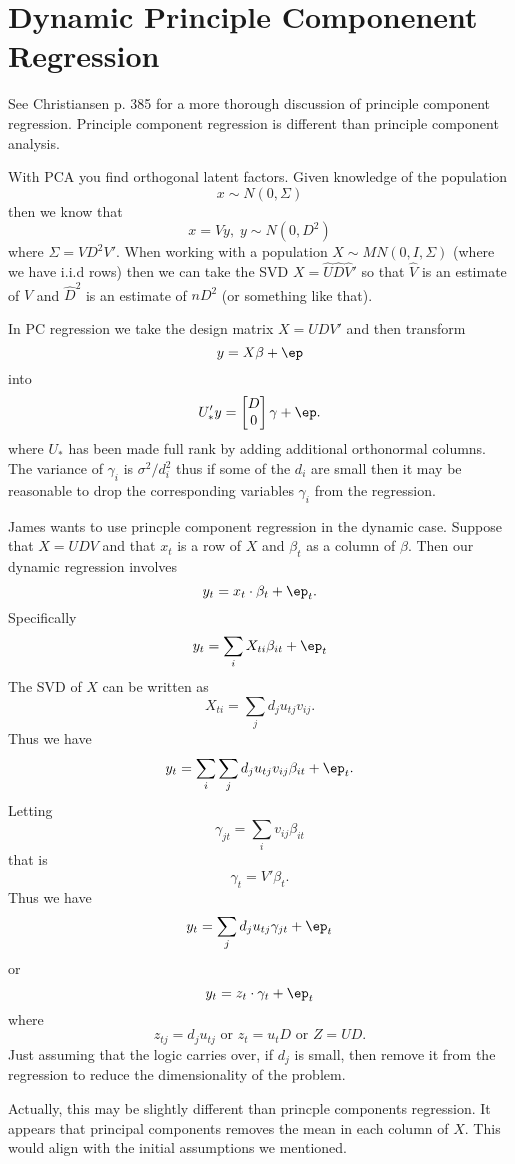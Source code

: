 \documentclass{article}
\begin{document}
\section{Dynamic Principle Componenent Regression}

See Christiansen p. 385 for a more thorough discussion of principle component
regression.  Principle component regression is different than principle
component analysis.

With PCA you find orthogonal latent factors.  Given knowledge of the population
\[
x \sim N(0, \Sigma)
\]
then we know that
\[
x = Vy, \; y \sim N(0, D^2)
\]
where $\Sigma = VD^2V'$.  When working with a population $X \sim MN(0, I,
\Sigma)$ (where we have i.i.d rows) then we can take the SVD $X = \hat U \hat D
\hat V'$ so that $\hat V$ is an estimate of $V$ and $\hat D^2$ is an estimate of
$n D^2$ (or something like that).

In PC regression we take the design matrix $X = U D V'$ and then transform
\[
y = X \beta + \ep
\]
into
\[
U_*' y = 
\begin{bmatrix}
D \\ 0
\end{bmatrix}
\gamma + \ep.
\]
where $U_*$ has been made full rank by adding additional orthonormal columns.
The variance of $\gamma_i$ is $\sigma^2 / d_i^2$ thus if some of the $d_i$ are
small then it may be reasonable to drop the corresponding variables $\gamma_i$
from the regression.

James wants to use princple component regression in the dynamic case.  Suppose
that $X = UDV$ and that $x_t$ is a row of $X$ and $\beta_t$ as a column of
$\beta$.  Then our dynamic regression involves
\[
y_t = x_t \cdot \beta_t + \ep_t.
\]
Specifically
\[
y_t = \sum_{i} X_{ti} \beta_{it} + \ep_t
\]
The SVD of $X$ can be written as
\[
X_{ti} = \sum_{j} d_j u_{tj} v_{ij}.
\]
Thus we have
\[
y_t = \sum_i \sum_j d_j u_{tj} v_{ij} \beta_{it} + \ep_t.
\]
Letting
\[
\gamma_{jt} = \sum_i v_{ij} \beta_{it}
\]
that is
\[
\gamma_t = V' \beta_t.
\]
Thus we have
\[
y_t = \sum_{j} d_j u_{tj} \gamma_{jt} + \ep_t
\]
or
\[
y_t = z_t \cdot \gamma_t + \ep_t
\]
where
\[
z_{tj} = d_j u_{tj} \text{ or } z_t = u_t D \text{ or } Z = UD.
\]
Just assuming that the logic carries over, if $d_j$ is small, then remove it
from the regression to reduce the dimensionality of the problem.

Actually, this may be slightly different than princple components regression.
It appears that principal components removes the mean in each column of $X$.
This would align with the initial assumptions we mentioned.
\end{document}

